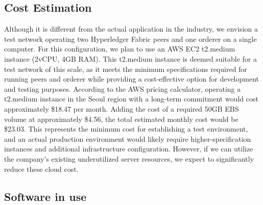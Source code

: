 \documentclass[conference]{IEEEtran}
\begin{document}
	\par

	\subsection{Cost Estimation}

	Although it is different from the actual application in the industry, we
	envision a test network operating two Hyperledger Fabric peers and one orderer
	on a single computer. For this configuration, we plan to use an AWS EC2 t2.medium
	instance (2vCPU, 4GB RAM). This t2.medium instance is deemed suitable for a
	test network of this scale, as it meets the minimum specifications required for
	running peers and orderer while providing a cost-effective option for development
	and testing purposes. According to the AWS pricing calculator, operating a t2.medium
	instance in the Seoul region with a long-term commitment would cost approximately
	\$18.47 per month. Adding the cost of a required 50GB EBS volume at approximately
	\$4.56, the total estimated monthly cost would be \$23.03. This represents the
	minimum cost for establishing a test environment, and an actual production
	environment would likely require higher-specification instances and additional
	infrastructure configuration. However, if we can utilize the company's
	existing underutilized server resources, we expect to significantly reduce these
	cloud cost.

	\subsection{Software in use}
\end{document}
